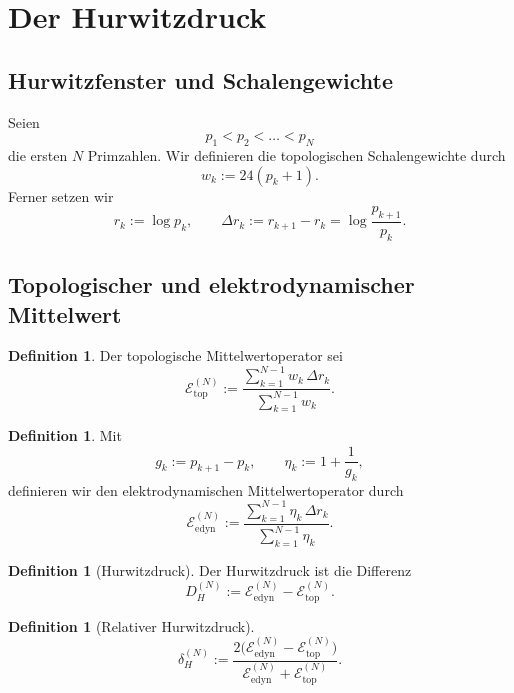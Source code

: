 \documentclass[a4paper,12pt]{article}
\theoremstyle{definition}
\newtheorem{definition}[satz]{Definition}
\numberwithin{equation}{section}
\begin{document}
	\section{Der Hurwitzdruck}
	
	\subsection{Hurwitzfenster und Schalengewichte}
	
	Seien
	\[
	p_1<p_2<\dots<p_N
	\]
	die ersten \(N\) Primzahlen. Wir definieren die topologischen Schalengewichte durch
	\[
	w_k:=24(p_k+1).
	\]
	Ferner setzen wir
	\[
	r_k:=\log p_k,
	\qquad
	\Delta r_k:=r_{k+1}-r_k=\log\!\frac{p_{k+1}}{p_k}.
	\]
	
	\subsection{Topologischer und elektrodynamischer Mittelwert}
	
	\begin{definition}
		Der topologische Mittelwertoperator sei
		\begin{equation}
			\mathcal E_{\mathrm{top}}^{(N)}
			:=
			\frac{\sum_{k=1}^{N-1} w_k\,\Delta r_k}
			{\sum_{k=1}^{N-1} w_k}.
		\end{equation}
	\end{definition}
	
	\begin{definition}
		Mit
		\[
		g_k:=p_{k+1}-p_k,
		\qquad
		\eta_k:=1+\frac1{g_k},
		\]
		definieren wir den elektrodynamischen Mittelwertoperator durch
		\begin{equation}
			\mathcal E_{\mathrm{edyn}}^{(N)}
			:=
			\frac{\sum_{k=1}^{N-1} \eta_k\,\Delta r_k}
			{\sum_{k=1}^{N-1} \eta_k}.
		\end{equation}
	\end{definition}
	
	\begin{definition}[Hurwitzdruck]
		Der Hurwitzdruck ist die Differenz
		\begin{equation}
			D_H^{(N)}
			:=
			\mathcal E_{\mathrm{edyn}}^{(N)}-\mathcal E_{\mathrm{top}}^{(N)}.
		\end{equation}
	\end{definition}
	
	\begin{definition}[Relativer Hurwitzdruck]
		\begin{equation}
			\delta_H^{(N)}
			:=
			\frac{2\bigl(\mathcal E_{\mathrm{edyn}}^{(N)}-\mathcal E_{\mathrm{top}}^{(N)}\bigr)}
			{\mathcal E_{\mathrm{edyn}}^{(N)}+\mathcal E_{\mathrm{top}}^{(N)}}.
		\end{equation}
	\end{definition}
	
\end{document}
